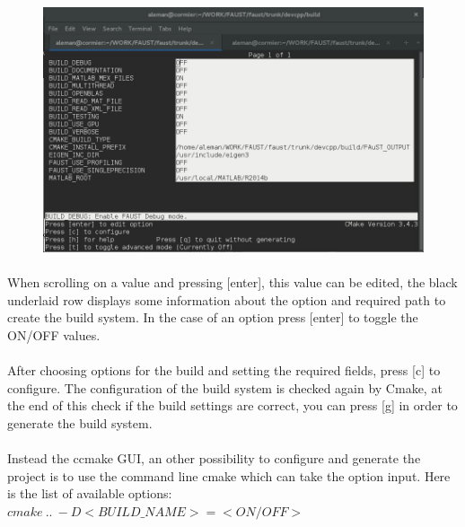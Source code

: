 \begin{figure}[!htbp]
\label{fig:ccmake}
\includegraphics[scale=0.5]{images/ccmake.jpg}
\end{figure}

\paragraph{}When scrolling on a value and pressing [enter], this value can be edited, the black underlaid row displays some information about the option and required path to create the build system. In the case of an option press [enter] to toggle the ON/OFF values.
\paragraph{}After choosing options for the build and setting the required fields, press [c] to configure. The configuration of the build system is checked again by Cmake, at the end of this check if the build settings are correct, you can press [g] in order to generate the build system.
	

\paragraph{} Instead the ccmake GUI, an other possibility to configure and generate the project is to use the command line cmake which can take the option input. Here is the list of available options: 
\texttt{$cmake\ ..\ -D<BUILD\_NAME>=<ON/OFF>$}

